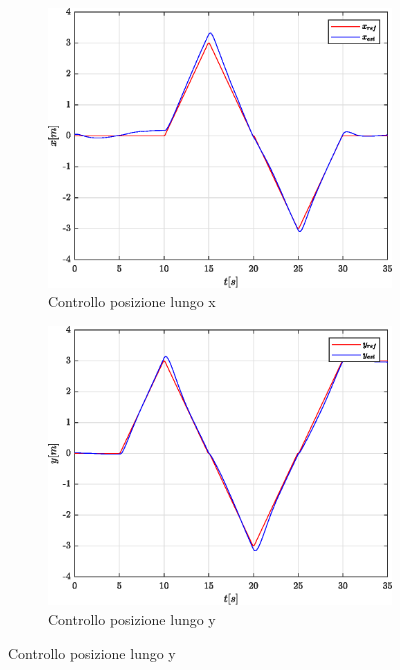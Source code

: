 \begin{figure}
	\centering
	\begin{subfigure}{0.45\textwidth}
		\centering
		\includegraphics[width=1\textwidth]{Simulazioni/Figure/PID/SQUARE/PositionControlXPos}
		\caption{Controllo posizione lungo x}
		\label{fig:SQUAREerrposxPID}
	\end{subfigure}
	\hfill
	\begin{subfigure}{0.45\textwidth}
		\centering
		\includegraphics[width=1\textwidth]{Simulazioni/Figure/PID/SQUARE/PositionControlYPos}
		\caption{Controllo posizione lungo y}

\end{subfigure}
\end{figure}

